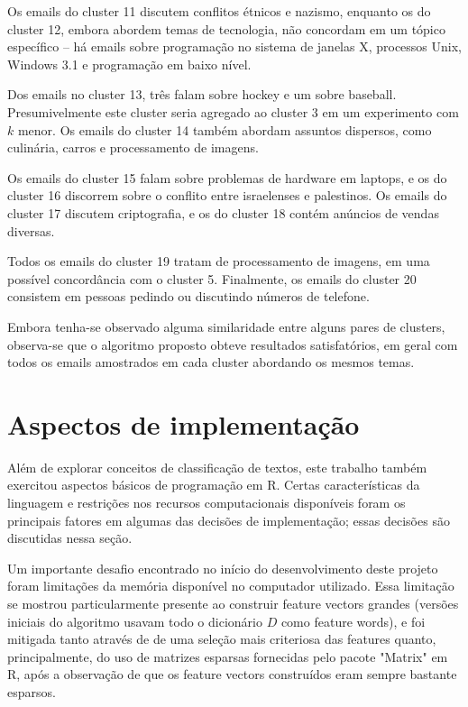 \documentclass[10pt,twocolumn,letterpaper]{article}
\begin{document}
Os emails do cluster 11 discutem conflitos étnicos e nazismo, enquanto os do cluster 12, embora abordem temas de tecnologia, não concordam em um tópico específico -- há emails sobre programação no sistema de janelas X, processos Unix, Windows 3.1 e programação em baixo nível.

Dos emails no cluster 13, três falam sobre hockey e um sobre baseball. Presumivelmente este cluster seria agregado ao cluster 3 em um experimento com $k$ menor.  Os emails do cluster 14 também abordam assuntos dispersos, como culinária, carros e processamento de imagens.

Os emails do cluster 15 falam sobre problemas de hardware em laptops, e os do cluster 16 discorrem sobre o conflito entre israelenses e palestinos. Os emails do cluster 17 discutem criptografia, e os do cluster 18 contém anúncios de vendas diversas.

Todos os emails do cluster 19 tratam de processamento de imagens, em uma possível concordância com o cluster 5. Finalmente, os emails do cluster 20 consistem em pessoas pedindo ou discutindo números de telefone.

Embora tenha-se observado alguma similaridade entre alguns pares de clusters, observa-se que o algoritmo proposto obteve resultados satisfatórios, em geral com todos os emails amostrados em cada cluster abordando os mesmos temas.

\section{Aspectos de implementação}
\label{sec-impl}

Além de explorar conceitos de classificação de textos, este trabalho também exercitou aspectos básicos de programação em R. Certas características da linguagem e restrições nos recursos computacionais disponíveis foram os principais fatores em algumas das decisões de implementação; essas decisões são discutidas nessa seção.

Um importante desafio encontrado no início do desenvolvimento deste projeto foram limitações da memória disponível no computador utilizado. Essa limitação se mostrou particularmente presente ao construir feature vectors grandes (versões iniciais do algoritmo usavam todo o dicionário $D$ como feature words), e foi mitigada tanto através de de uma seleção mais criteriosa das features quanto, principalmente, do uso de matrizes esparsas fornecidas pelo pacote "Matrix" em R, após a observação de que os feature vectors construídos eram sempre bastante esparsos.
\end{document}
